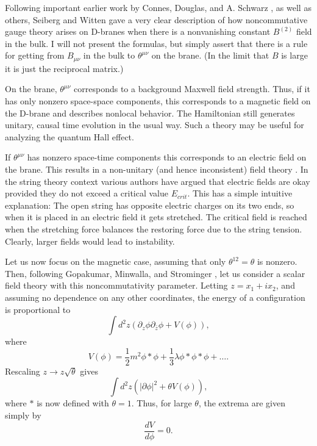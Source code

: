 \documentclass[a4paper,12pt]{article}
\begin{document}
Following important earlier work by Connes, Douglas, and A.
Schwarz \cite{CDS}, as well as others, Seiberg and Witten \cite{SW} gave a very clear
description of how noncommutative gauge theory arises on D-branes
when there is a nonvanishing constant $B^{(2)}$ field in the bulk.
I will not present the formulas, but simply assert that there is a
rule for getting from $B_{\mu\nu}$ in the bulk to
$\theta^{\mu\nu}$ on the brane.  (In the limit that $B$ is large
it is just the reciprocal matrix.)

On the brane, $\theta^{\mu\nu}$ corresponds to a background
Maxwell field strength.  Thus, if it has only nonzero space-space
components, this corresponds to a magnetic field on the D-brane
and describes nonlocal behavior.  The Hamiltonian still generates
unitary, causal time evolution in the usual way. Such a theory may
be useful for analyzing the quantum Hall effect.

If $\theta^{\mu\nu}$ has nonzero space-time components this
corresponds to an electric field on the brane.  This results in a
non-unitary (and hence inconsistent) field theory \cite{GM}.  In the string
theory context various authors have argued that electric fields
are okay provided they do not exceed a critical value $E_{crit}$.
This has a simple intuitive explanation: The open string has
opposite electric charges on its two ends, so when it is placed in
an electric field it gets stretched. The critical field is reached
when the stretching force balances the restoring force due to the
string tension.  Clearly, larger fields would lead to instability.

Let us now focus on the magnetic case, assuming that only
$\theta^{12} = \theta$ is nonzero.  Then, following Gopakumar,
Minwalla, and Strominger \cite{GMS}, let us consider a scalar field theory
with this noncommutativity parameter. Letting $z = x_1 + i x_2$,
and assuming no dependence on any other coordinates, the energy of
a configuration is proportional to
\begin{equation}
\int d^2 z (\partial_z \phi \partial_{\bar z} \phi + V(\phi)),
\end{equation}
where
\begin{equation}
V (\phi) = \frac{1}{2} m^2 \phi * \phi + \frac{1}{3} \lambda \phi * \phi * \phi
+ \ldots.
\end{equation}
Rescaling $z \rightarrow z \sqrt{\theta}$ gives
\begin{equation}
 \int d^2 z (|\partial \phi|^2 + \theta V (\phi)),
\end{equation}
where $*$ is now defined with $\theta = 1$.  Thus, for large
$\theta$, the extrema are given simply by
\begin{equation}
\frac{dV}{d\phi} = 0.
\end{equation}
\end{document}
